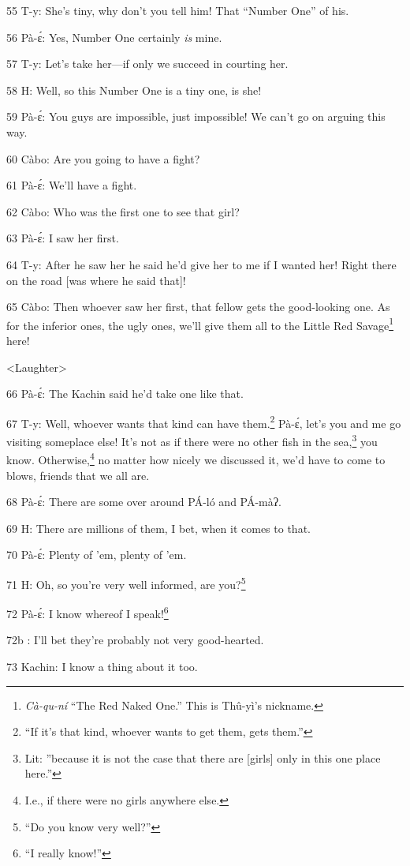 55 T-y: She's tiny, why don't you tell him! That ``Number One'' of his.

56 Pà-ɛ́: Yes, Number One certainly\textit{ is} mine.

57 T-y: Let's take her---if only we succeed in courting her.

58 H: Well, so this Number One is a tiny one, is she!

59 Pà-ɛ́: You guys are impossible, just impossible! We can't go on arguing this
way.

60 Càbo: Are you going to have a fight?

61 Pà-ɛ́: We'll have a fight.

62 Càbo: Who was the first one to see that girl?

63 Pà-ɛ́: I saw her first.

64 T-y: After he saw her he said he'd give her to me if I wanted her! Right there
on the road [was where he said that]!

65 Càbo: Then whoever saw her first, that fellow gets the good-looking one. As
for the inferior ones, the ugly ones, we'll give them all to the Little Red Savage\footnote{\textit{Cà-qu-ní} ``The Red Naked One.'' This is Thû-yì's nickname.}
here!

<Laughter>

66 Pà-ɛ́: The Kachin said he'd take one like that.

67 T-y: Well, whoever wants that kind can have them.\footnote{``If it's that kind, whoever wants to get them, gets them.''} Pà-ɛ́, let's you and
me go visiting someplace else! It's not as if there were no other fish in the sea,\footnote{Lit: ''because it is not the case that there are [girls] only in this one place here.''}
you know. Otherwise,\footnote{I.e., if there were no girls anywhere else.} no matter how nicely we discussed it, we'd have to come
to blows, friends that we all are.

68 Pà-ɛ́: There are some over around PÁ-ló and PÁ-màʔ.

69 H: There are millions of them, I bet, when it comes to that.

70 Pà-ɛ́: Plenty of 'em, plenty of 'em.

71 H: Oh, so you're very well informed, are you?\footnote{``Do you know very well?''}

72 Pà-ɛ́: I know whereof I speak!\footnote{``I really know!''}

72b       : I'll bet they're probably not very good-hearted.

73 Kachin: I know a thing about it too.

